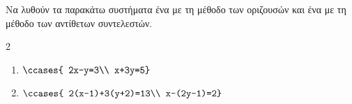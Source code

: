 Να λυθούν τα παρακάτω συστήματα ένα με τη μέθοδο των οριζουσών και ένα με τη μέθοδο των αντίθετων συντελεστών.
\begin{multicols}{2}
\begin{enumerate}
\item $\ccases{
2x-y=3\\
x+3y=5}$
\item $\ccases{
2(x-1)+3(y+2)=13\\
x-(2y-1)=2}$
\end{enumerate}\end{multicols}